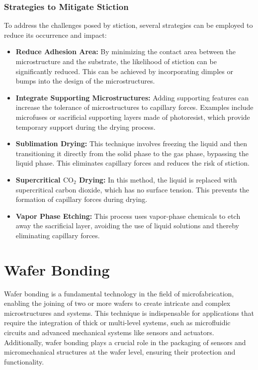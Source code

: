 \documentclass{report}
\begin{document}
\subsubsection{Strategies to Mitigate Stiction}
To address the challenges posed by stiction, several strategies can be employed to reduce its occurrence and impact:
\begin{itemize}
    \item \textbf{Reduce Adhesion Area:} By minimizing the contact area between the microstructure and the substrate, the likelihood of stiction can be significantly reduced. This can be achieved by incorporating dimples or bumps into the design of the microstructures.
    \item \textbf{Integrate Supporting Microstructures:} Adding supporting features can increase the tolerance of microstructures to capillary forces. Examples include microfuses or sacrificial supporting layers made of photoresist, which provide temporary support during the drying process.
    \item \textbf{Sublimation Drying:} This technique involves freezing the liquid and then transitioning it directly from the solid phase to the gas phase, bypassing the liquid phase. This eliminates capillary forces and reduces the risk of stiction.
    \item \textbf{Supercritical $\text{CO}_{2}$ Drying:} In this method, the liquid is replaced with supercritical carbon dioxide, which has no surface tension. This prevents the formation of capillary forces during drying.
    \item \textbf{Vapor Phase Etching:} This process uses vapor-phase chemicals to etch away the sacrificial layer, avoiding the use of liquid solutions and thereby eliminating capillary forces.
\end{itemize}

\section{Wafer Bonding}
Wafer bonding is a fundamental technology in the field of microfabrication, enabling the joining of two or more wafers to create intricate and complex microstructures and systems. This technique is indispensable for applications that require the integration of thick or multi-level systems, such as microfluidic circuits and advanced mechanical systems like sensors and actuators. Additionally, wafer bonding plays a crucial role in the packaging of sensors and micromechanical structures at the wafer level, ensuring their protection and functionality.
\end{document}
